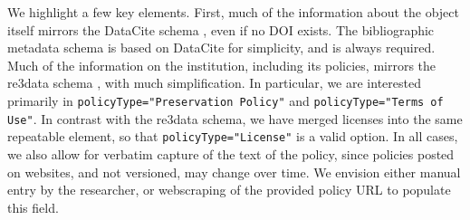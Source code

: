 
We highlight a few key elements. First, much of the information about the object itself mirrors the DataCite schema \parencite{DataCiteMetadataWorkingGroupDataCiteMetadataSchema2017,DataCiteMetadataWorkingGroupDataCiteMetadataSchema2017a}, even if no \ac{DOI} exists. The bibliographic metadata schema is based on DataCite for simplicity, and is always required. Much of the information on the institution, including its policies, mirrors the re3data schema \parencite{Re3data.Orgre3dataorgMetadata2015,RucknagelMetadataSchemaDescription2015}, with much simplification. In particular, we are interested primarily in \texttt{policyType="Preservation Policy"} and \texttt{policyType="Terms of Use"}. In contrast with the re3data schema, we have merged licenses into the same repeatable element, so that \texttt{policyType="License"} is a valid option. In all cases, we also allow for verbatim capture of the text of the policy, since policies posted on websites, and not versioned, may change over time. We envision either manual entry by the researcher, or webscraping of the provided policy \ac{URL} to populate this field.